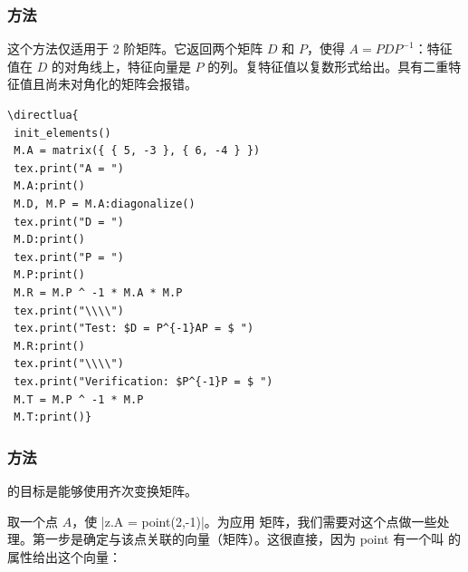 \subsubsection{方法 }
\label{ssub:diagonalization}

这个方法仅适用于 2 阶矩阵。它返回两个矩阵 $D$ 和 $P$，使得 $A = PDP^{-1}$：特征值在 $D$ 的对角线上，特征向量是 $P$ 的列。复特征值以复数形式给出。具有二重特征值且尚未对角化的矩阵会报错。

\begin{minipage}{.5\textwidth}
\begin{verbatim}
\directlua{
 init_elements()
 M.A = matrix({ { 5, -3 }, { 6, -4 } })
 tex.print("A = ")
 M.A:print()
 M.D, M.P = M.A:diagonalize()
 tex.print("D = ")
 M.D:print()
 tex.print("P = ")
 M.P:print()
 M.R = M.P ^ -1 * M.A * M.P
 tex.print("\\\\")
 tex.print("Test: $D = P^{-1}AP = $ ")
 M.R:print()
 tex.print("\\\\")
 tex.print("Verification: $P^{-1}P = $ ")
 M.T = M.P ^ -1 * M.P
 M.T:print()}
\end{verbatim}
\end{minipage}
\begin{minipage}{.5\textwidth}
\end{minipage}

\subsubsection{方法 }
\label{ssub:method_homogenization}

 的目标是能够使用齐次变换矩阵。

取一个点 $A$，使 |z.A = point(2,-1)|。为应用  矩阵，我们需要对这个点做一些处理。第一步是确定与该点关联的向量（矩阵）。这很直接，因为 point 有一个叫  的属性给出这个向量：

